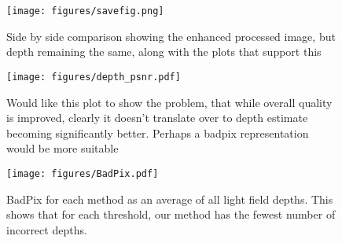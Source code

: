 \documentclass[10pt,journal,compsoc]{IEEEtran}
\begin{document}
\begin{figure}
\texttt{[image: figures/savefig.png]}
    \caption{\label{fig:fig_d} Side by side comparison showing the enhanced processed image, but depth remaining the same, along with the plots that support this}
\end{figure}

\begin{figure}
\texttt{[image: figures/depth\_psnr.pdf]}
    \caption{\label{fig:fig_rankings} Would like this plot to show the problem, that while overall quality is improved, clearly it doesn't translate over to depth estimate becoming significantly better. Perhaps a badpix representation would be more suitable}
\end{figure}

\begin{figure}
\texttt{[image: figures/BadPix.pdf]}
    \caption{\label{fig:fig_bad} BadPix for each method as an average of all light field depths. This shows that for each threshold, our method has the fewest number of incorrect depths.}
\end{figure}
\end{document}
